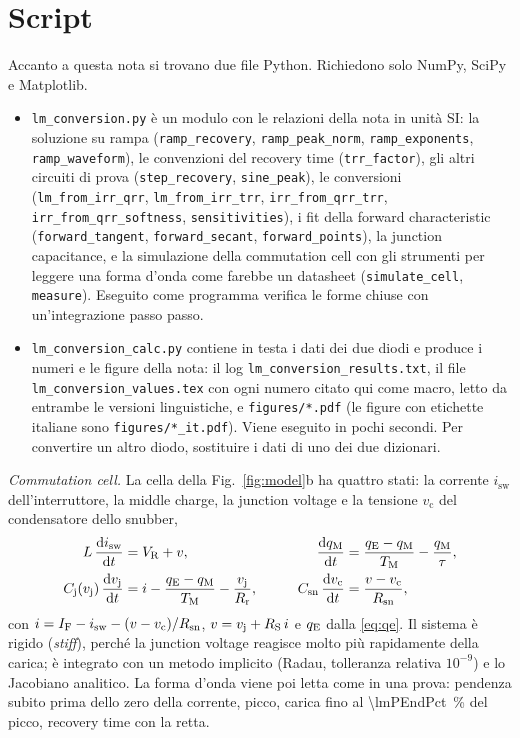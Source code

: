 \documentclass[10pt,a4paper]{scrartcl}
\let\newcommand\lmitdefine
\newcommand{\IF}{I_\mathrm{F}}
\newcommand{\VR}{V_\mathrm{R}}
\newcommand{\TM}{T_\mathrm{M}}
\newcommand{\qE}{q_\mathrm{E}}
\newcommand{\qM}{q_\mathrm{M}}
\newcommand{\vj}{v_\mathrm{j}}
\newcommand{\RS}{R_\mathrm{S}}
\newcommand{\Rr}{R_\mathrm{r}}
\newcommand{\Cj}{C_\mathrm{j}}
\newcommand{\Csn}{C_\mathrm{sn}}
\newcommand{\Rsn}{R_\mathrm{sn}}
\newcommand{\diff}{\mathrm{d}}
\begin{document}
\section{Script}
\label{app:scripts}
Accanto a questa nota si trovano due file Python. Richiedono solo NumPy, SciPy e Matplotlib.
\begin{itemize}
\emergencystretch=3em
\item \texttt{lm\_conversion.py} è un modulo con le relazioni della nota in unità SI: la soluzione su rampa (\texttt{ramp\_recovery}, \texttt{ramp\_peak\_norm}, \texttt{ramp\_exponents}, \texttt{ramp\_waveform}), le convenzioni del recovery time (\texttt{trr\_factor}), gli altri circuiti di prova (\texttt{step\_recovery}, \texttt{sine\_peak}), le conversioni (\texttt{lm\_from\_irr\_qrr}, \texttt{lm\_from\_irr\_trr}, \texttt{irr\_from\_qrr\_trr}, \texttt{irr\_from\_qrr\_softness}, \texttt{sensitivities}), i fit della forward characteristic (\texttt{forward\_tangent}, \texttt{forward\_secant}, \texttt{forward\_points}), la junction capacitance, e la simulazione della commutation cell con gli strumenti per leggere una forma d'onda come farebbe un datasheet (\texttt{simulate\_cell}, \texttt{measure}). Eseguito come programma verifica le forme chiuse con un'integrazione passo passo.
\item \texttt{lm\_conversion\_calc.py} contiene in testa i dati dei due diodi e produce i numeri e le figure della nota: il log \texttt{lm\_conversion\_results.txt}, il file \texttt{lm\_conversion\_values.tex} con ogni numero citato qui come macro, letto da entrambe le versioni linguistiche, e \texttt{figures/*.pdf} (le figure con etichette italiane sono \texttt{figures/*\_it.pdf}). Viene eseguito in pochi secondi. Per convertire un altro diodo, sostituire i dati di uno dei due dizionari.
\end{itemize}

\emph{Commutation cell.} La cella della Fig.~\ref{fig:model}b ha quattro stati: la corrente $i_\mathrm{sw}$ dell'interruttore, la middle charge, la junction voltage e la tensione $v_\mathrm{c}$ del condensatore dello snubber,
\begin{equation}
\begin{aligned}
L\,\frac{\diff i_\mathrm{sw}}{\diff t} &= \VR + v , &\qquad \frac{\diff\qM}{\diff t} &= \frac{\qE-\qM}{\TM} - \frac{\qM}{\tau} , \\
\Cj(\vj)\,\frac{\diff\vj}{\diff t} &= i - \frac{\qE-\qM}{\TM} - \frac{\vj}{\Rr} , &\qquad \Csn\,\frac{\diff v_\mathrm{c}}{\diff t} &= \frac{v - v_\mathrm{c}}{\Rsn} ,
\end{aligned}
\end{equation}
con $i = \IF - i_\mathrm{sw} - (v-v_\mathrm{c})/\Rsn$, $v = \vj + \RS\,i$ e $\qE$ dalla \eqref{eq:qe}. Il sistema è rigido (\emph{stiff}), perché la junction voltage reagisce molto più rapidamente della carica; è integrato con un metodo implicito (Radau, tolleranza relativa $10^{-9}$) e lo Jacobiano analitico. La forma d'onda viene poi letta come in una prova: pendenza subito prima dello zero della corrente, picco, carica fino al \SI{\lmPEndPct}{\percent} del picco, recovery time con la retta.
\end{document}
